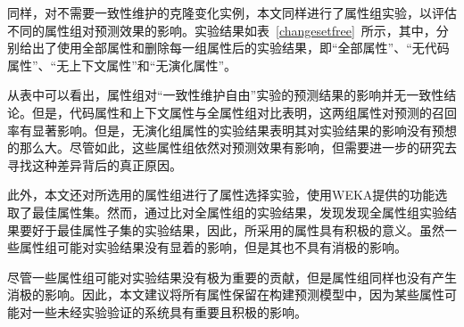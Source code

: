 同样，对不需要一致性维护的克隆变化实例，本文同样进行了属性组实验，以评估不同的属性组对预测效果的影响。实验结果如表~\ref{changesetfree}~所示，其中，分别给出了使用全部属性和删除每一组属性后的实验结果，即“全部属性”、“无代码属性”、“无上下文属性”和“无演化属性”。

从表中可以看出，属性组对“一致性维护自由”实验的预测结果的影响并无一致性结论。但是，代码属性和上下文属性与全属性组对比表明，这两组属性对预测的召回率有显著影响。但是，无演化组属性的实验结果表明其对实验结果的影响没有预想的那么大。尽管如此，这些属性组依然对预测效果有影响，但需要进一步的研究去寻找这种差异背后的真正原因。


此外，本文还对所选用的属性组进行了属性选择实验，使用WEKA提供的功能选取了最佳属性集。然而，通过比对全属性组的实验结果，发现发现全属性组实验结果要好于最佳属性子集的实验结果，因此，所采用的属性具有积极的意义。虽然一些属性组可能对实验结果没有显着的影响，但是其也不具有消极的影响。


尽管一些属性组可能对实验结果没有极为重要的贡献，但是属性组同样也没有产生消极的影响。因此，本文建议将所有属性保留在构建预测模型中，因为某些属性可能对一些未经实验验证的系统具有重要且积极的影响。


